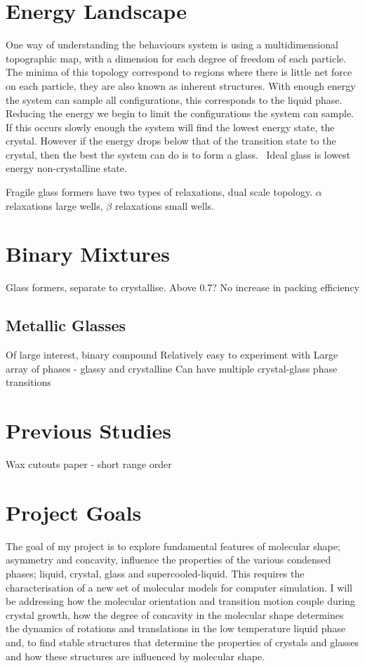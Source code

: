 \section{Energy Landscape}
One way of understanding the behaviours system is using a multidimensional topographic map, with a dimension for each degree of freedom of each particle. The minima of this topology correspond to regions where there is little net force on each particle, they are also known as inherent structures. With enough energy the system can sample all configurations, this corresponds to the liquid phase. Reducing the energy we begin to limit the configurations the system can sample. If this occurs slowly enough the system will find the lowest energy state, the crystal. However if the energy drops below that of the transition state to the crystal, then the best the system can do is to form a glass.~\cite{stillinger:95} Ideal glass is lowest energy non-crystalline state.

\begin{figure}
\end{figure}

Fragile glass formers have two types of relaxations, dual scale topology. $\alpha$ relaxations large wells, $\beta$ relaxations small wells.~\cite{stillinger:95}

\section{Binary Mixtures}
Glass formers, separate to crystallise. Above 0.7? No increase in packing efficiency

\subsection{Metallic Glasses}
Of large interest, binary compound
Relatively easy to experiment with
Large array of phases - glassy and crystalline
Can have multiple crystal-glass phase transitions



\section{Previous Studies}
Wax cutouts paper - short range order

\section{Project Goals}

The goal of my project is to explore fundamental features of molecular shape; asymmetry and concavity, influence the properties of the various condensed phases; liquid, crystal, glass and supercooled-liquid. This requires the characterisation of a new set of molecular models for computer simulation. I will be addressing how the molecular orientation and transition motion couple during crystal growth, how the degree of concavity in the molecular shape determines the dynamics of rotations and translations in the low temperature liquid phase and, to find stable structures that determine the properties of crystals and glasses and how these structures are influenced by molecular shape.

